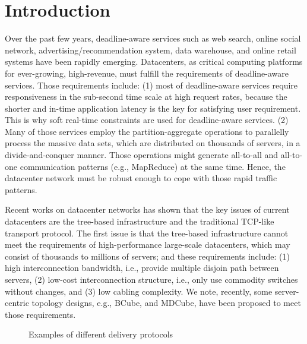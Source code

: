 \documentclass[conference]{IEEEtran}
\begin{document}
\IEEEpeerreviewmaketitle



\section{Introduction}
Over the past few years, deadline-aware services such as web search, online social network, advertising/recommendation system, data warehouse, and online retail systems have been rapidly emerging. Datacenters, as critical computing platforms for ever-growing, high-revenue, must fulfill the requirements of deadline-aware services. Those requirements include: (1) most of deadline-aware services require responsiveness in the sub-second time scale at high request rates, because the shorter and in-time application latency is the key for satisfying user requirement. This is why soft real-time constraints are used for deadline-aware services. (2) Many of those services employ the partition-aggregate operations to parallelly process the massive data sets, which are distributed on thousands of servers, in a divide-and-conquer manner\cite{websearchforaplanet}. Those operations might generate all-to-all and all-to-one communication patterns (e.g., MapReduce\cite{mapreduce}) at the same time. Hence, the datacenter network must be robust enough to cope with those rapid traffic patterns.

Recent works on datacenter networks\cite{bcube, mdcube, mptcp, dctcp} has shown that the key issues of current datacenters are the tree-based infrastructure and the traditional TCP-like transport protocol. The first issue is that the tree-based infrastructure cannot meet the requirements of high-performance large-scale datacenters, which may consist of thousands to millions of servers\cite{mdcube}; and these requirements include: (1) high interconnection bandwidth, i.e., provide multiple disjoin path between servers, (2) low-cost interconnection structure, i.e., only use commodity switches without changes, and (3) low cabling complexity. We note, recently, some server-centric topology designs, e.g., BCube\cite{bcube}, and MDCube\cite{mdcube}, have been proposed to meet those requirements.



\begin{figure}
  \centering
  \caption[what]{Examples of different delivery protocols}\label{fig:ex3p}
\end{figure}
\end{document}
